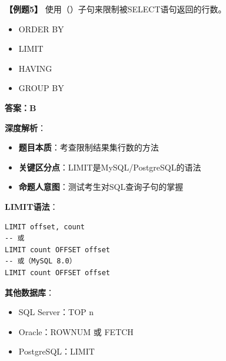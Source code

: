\documentclass[12pt, a4paper]{article}
\newenvironment{bluebox}[1]{%
  \begin{trivlist}
  \item[\hskip\labelsep \textbf{#1}]
  \setlength{\parskip}{0.5ex}
  \setlength{\itemsep}{0.5ex}
}{%
  \end{trivlist}
}
\begin{document}
\begin{bluebox}{例题5：LIMIT子句}
	\textbf{【例题5】} 使用（\quad）子句来限制被SELECT语句返回的行数。

	\begin{itemize}
		\item[A)] ORDER BY
		\item[B)] LIMIT
		\item[C)] HAVING
		\item[D)] GROUP BY
	\end{itemize}

	\textbf{答案：B}

	\textbf{深度解析}：

	\begin{itemize}
		\item \textbf{题目本质}：考查限制结果集行数的方法
		\item \textbf{关键区分点}：LIMIT是MySQL/PostgreSQL的语法
		\item \textbf{命题人意图}：测试考生对SQL查询子句的掌握
	\end{itemize}

	\textbf{LIMIT语法}：
	\begin{verbatim}
LIMIT offset, count
-- 或
LIMIT count OFFSET offset
-- 或（MySQL 8.0）
LIMIT count OFFSET offset
	\end{verbatim}

	\textbf{其他数据库}：
	\begin{itemize}
		\item SQL Server：TOP n
		\item Oracle：ROWNUM 或 FETCH
		\item PostgreSQL：LIMIT
	\end{itemize}
\end{bluebox}
\end{document}
